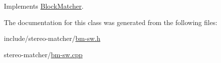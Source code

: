 Implements \hyperlink{classBlockMatcher_af80a89fda1b2fd2d78e75e7466dcbcca}{Block\+Matcher}.



The documentation for this class was generated from the following files\+:\begin{DoxyCompactItemize}
\item 
include/stereo-\/matcher/\hyperlink{bm-sw_8h}{bm-\/sw.\+h}\item 
stereo-\/matcher/\hyperlink{bm-sw_8cpp}{bm-\/sw.\+cpp}\end{DoxyCompactItemize}
